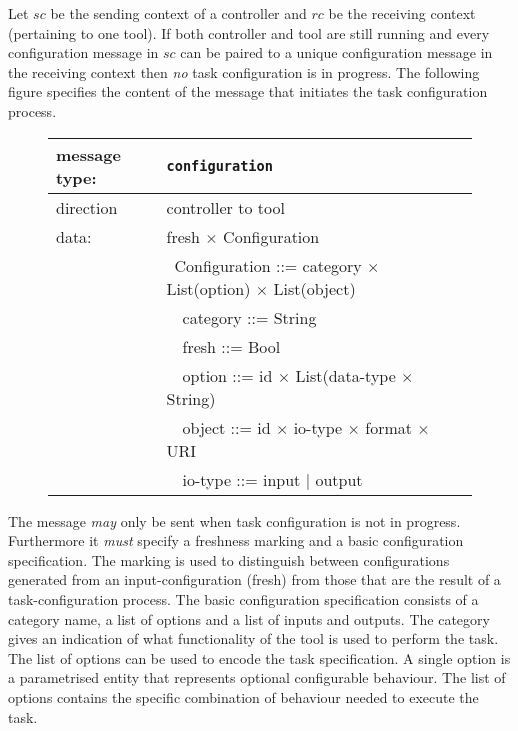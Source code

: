 \documentclass{article}
\newcommand{\msg}[1]{\texttt{#1}}
\begin{document}
   Let $sc$ be the sending context of a controller and $rc$ be the receiving
   context (pertaining to one tool). If both controller and tool are still
   running and every configuration message in $sc$ can be paired to a unique
   configuration message in the receiving context then \emph{no} task
   configuration is in progress. The following figure specifies the content of
   the message that initiates the task configuration process.
   \begin{figure}[H]
    \begin{center}
     \begin{tabular}{|ll|}
      \hline
       message type:   & \msg{configuration} \\
      \hline
       direction       & controller to tool \\
       data:           & fresh $\times$ Configuration \\
                       & \ Configuration ::= category $\times$ List(option) $\times$ List(object) \\
                       & \ \ category ::= String \\
                       & \ \ fresh    ::= Bool \\
                       & \ \ option   ::= id $\times$ List(data-type $\times$ String) \\
                       & \ \ object   ::= id $\times$ io-type $\times$ format $\times$ URI \\
                       & \ \ io-type  ::= input $|$ output \\
      \hline
     \end{tabular}
    \end{center}
   \end{figure}
   \vspace{-0.4cm}

   \noindent The message \emph{may} only be sent when task configuration is not
   in progress.  Furthermore it \emph{must} specify a freshness marking and a
   basic configuration specification.  The marking is used to distinguish
   between configurations generated from an input-configuration (fresh) from
   those that are the result of a task-configuration process.  The basic
   configuration specification consists of a category name, a list of options
   and a list of inputs and outputs. The category gives an indication of what
   functionality of the tool is used to perform the task.  The list of options
   can be used to encode the task specification. A single option is a
   parametrised entity that represents optional configurable behaviour. The
   list of options contains the specific combination of behaviour needed to
   execute the task.
\end{document}

